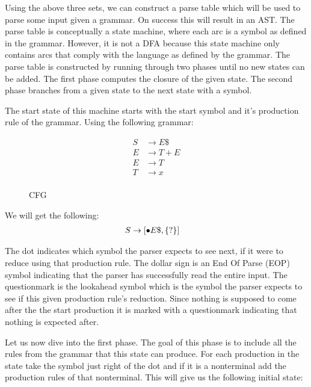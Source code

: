 Using the above three sets, we can construct a parse table which will be used to parse some input given a grammar. On success this will result in an AST. The parse table is conceptually a state machine, where each arc is a symbol as defined in the grammar. However, it is not a DFA because this state machine only contains arcs that comply with the language as defined by the grammar. The parse table is constructed by running through two phases until no new states can be added. The first phase computes the closure of the given state. The second phase branches from a given state to the next state with a symbol.

The start state of this machine starts with the start symbol and it's production rule of the grammar. Using the following grammar:

\begin{figure}[H]
  \begin{equation*}
    \begin{split}
        S &\rightarrow E\$\\
        E &\rightarrow T + E\\
        E &\rightarrow T\\
        T &\rightarrow x\\
    \end{split}
  \end{equation*}
  \caption{CFG}\label{cfgparser}
\end{figure}

We will get the following:
\begin{equation*}
  \begin{split}
      S &\rightarrow [\bullet E\text{\$}, \left\{?\right\}] 
  \end{split}
\end{equation*}

The dot indicates which symbol the parser expects to see next, if it were to reduce using that production rule. The dollar sign is an End Of Parse (EOP) symbol indicating that the parser has successfully read the entire input. The questionmark is the lookahead symbol which is the symbol the parser expects to see if this given production rule's reduction. Since nothing is supposed to come after the the start production it is marked with a questionmark indicating that nothing is expected after. 

Let us now dive into the first phase. The goal of this phase is to include all the rules from the grammar that this state can produce. For each production in the state take the symbol just right of the dot and if it is a nonterminal add the production rules of that nonterminal. This will give us the following initial state:

